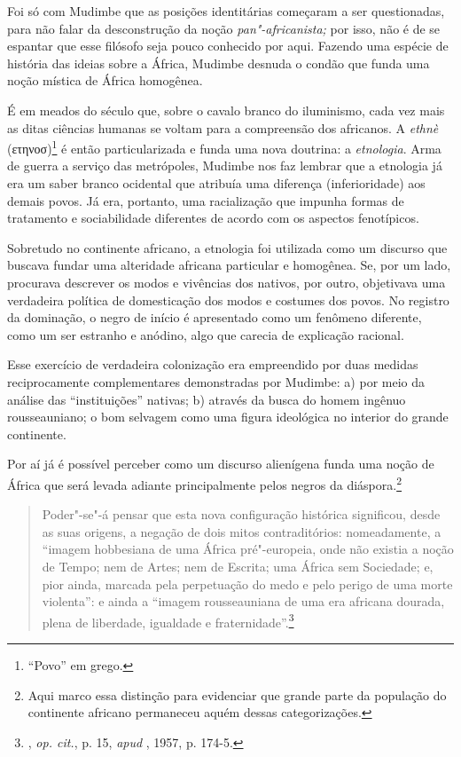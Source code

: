 Foi só com Mudimbe que as posições identitárias começaram a ser
questionadas, para não falar da desconstrução da noção
\emph{pan"-africanista;} por isso, não é de se espantar que esse filósofo
seja pouco conhecido por aqui. Fazendo uma espécie de história das
ideias sobre a África, Mudimbe desnuda o condão que funda uma noção
mística de África homogênea.

É em meados do século  que, sobre o cavalo branco do iluminismo, cada
vez mais as ditas ciências humanas se voltam para a compreensão dos
africanos. A \emph{ethnè} (ετηνοσ)\footnote{``Povo'' em grego.} é então
particularizada e funda uma nova doutrina: a \emph{etnologia}. Arma de
guerra a serviço das metrópoles, Mudimbe nos faz lembrar que a etnologia
já era um saber branco ocidental que atribuía uma diferença
(inferioridade) aos demais povos. Já era, portanto, uma racialização que
impunha formas de tratamento e sociabilidade diferentes de acordo com os
aspectos fenotípicos.

Sobretudo no continente africano, a etnologia foi utilizada como um
discurso que buscava fundar uma alteridade africana particular e
homogênea. Se, por um lado, procurava descrever os modos e vivências dos
nativos, por outro, objetivava uma verdadeira política de domesticação
dos modos e costumes dos povos. No registro da dominação, o negro de
início é apresentado como um fenômeno diferente, como um ser estranho e
anódino, algo que carecia de explicação racional.

Esse exercício de verdadeira colonização era empreendido por duas
medidas reciprocamente complementares demonstradas por Mudimbe:
a) por meio da análise das ``instituições'' nativas; b)
através da busca do homem ingênuo rousseauniano; o bom selvagem como uma
figura ideológica no interior do grande continente.

Por aí já é possível perceber como um discurso alienígena funda uma
noção de África que será levada adiante principalmente pelos negros da
diáspora.\footnote{Aqui marco essa distinção para evidenciar que grande
  parte da população do continente africano permaneceu aquém dessas
  categorizações.}

\begin{quote}
Poder"-se"-á pensar que esta nova configuração histórica significou, desde
as suas origens, a negação de dois mitos contraditórios: nomeadamente, a
``imagem hobbesiana de uma África pré"-europeia, onde não existia a noção
de Tempo; nem de Artes; nem de Escrita; uma África sem Sociedade; e,
pior ainda, marcada pela perpetuação do medo e pelo perigo de uma morte
violenta'': e ainda a ``imagem rousseauniana de uma era africana
dourada, plena de liberdade, igualdade e fraternidade''.\footnote{,
  \emph{op. cit.}, p. 15, \emph{apud} , 1957, p. 174-5.}
\end{quote}

